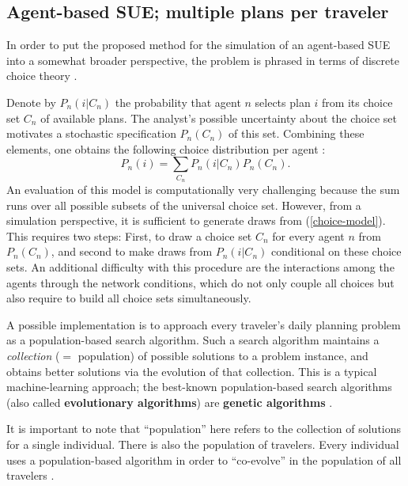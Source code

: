 \subsection{Agent-based SUE; multiple plans per traveler}
\label{sec:agent-based-sue}

In order to put the proposed method for the simulation of an agent-based
SUE into a somewhat broader perspective, the problem
is phrased in terms of discrete choice theory \citep{ben-akiva-1985}.

Denote by $P_n(i|C_n)$ the probability that agent $n$ selects plan $i$
from its choice set $C_n$ of available plans. The analyst's possible
uncertainty about the choice set motivates a stochastic specification 
$P_n(C_n)$ of this set.
Combining these elements, one obtains the following choice
distribution per agent \citep{manski-1977}:
\begin{equation}
P_n(i) = \sum_{C_n} P_n(i|C_n) P_n(C_n).
\label{choice-model}
\end{equation}
An evaluation of this model is
computationally very challenging because the sum runs over all
possible subsets of the universal choice set. However,
from a simulation perspective, it is sufficient to generate draws from
(\ref{choice-model}). This requires two steps: First, to draw a choice
set $C_n$ for every agent $n$ from $P_n(C_n)$, and second to make
draws from $P_n(i|C_n)$ conditional on these choice sets. An
additional difficulty with this procedure are the interactions among
the agents through the network conditions,
which do not only couple all choices but also require
to build all choice sets simultaneously.

A possible implementation is to approach every traveler's daily
planning problem as a population-based search algorithm.  Such a
search algorithm maintains a \emph{collection} ($=$ population) of
possible solutions to a problem instance, and obtains better solutions
via the evolution of that collection.  This is a typical
machine-learning \citep[e.g.][]{RussellNorvigBook} approach; the best-known
population-based search algorithms (also called \textbf{evolutionary
  algorithms}) are \textbf{genetic algorithms} \citep[e.g.,][]{GoldbergBook}.

It is important to note that ``population'' here refers to the
collection of solutions for a single individual.  There is also the
population of travelers.  Every individual uses a population-based
algorithm in order to ``co-evolve'' in the population of all
travelers \citep[also see][]{Balmer2007phd}.

